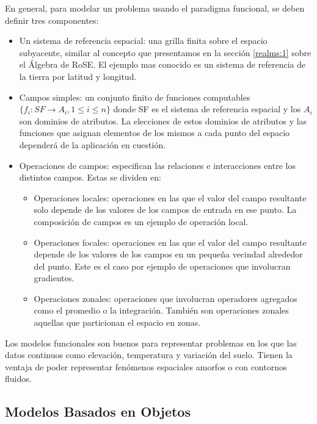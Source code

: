 En general, para modelar un problema usando el paradigma funcional, se deben definir tres componentes\textsuperscript{\cite{worboyz}}:
\begin{itemize}
    \item Un sistema de referencia espacial: una grilla finita sobre el espacio subyacente,
    similar al concepto que presentamos en la sección \ref{realms:1} sobre el Álgebra de RoSE.
    El ejemplo mas conocido es un sistema de referencia de la tierra por latitud y longitud.
    \item Campos simples: un conjunto finito de funciones computables $\{f_i: SF \rightarrow A_i, 1 \le i \le n\}$
    donde SF es el sistema de referencia espacial y los $A_i$ son dominios de atributos. La elecciones de estos dominios de atributos
    y las funciones que asignan elementos de los mismos a cada punto del espacio dependerá de la aplicación en cuestión.
    \item Operaciones de campos: especifican las relaciones e interacciones entre los distintos campos. Estas se dividen en:
    \begin{itemize}
        \item Operaciones locales: operaciones en las que el valor del campo resultante solo depende de los valores de los campos de entrada en ese punto.
        La composición de campos es un ejemplo de operación local.
        \item Operaciones focales: operaciones en las que el valor del campo resultante depende de los valores de los campos en un pequeña vecindad alrededor del punto.
        Este es el caso por ejemplo de operaciones que involucran gradientes.
        \item Operaciones zonales: operaciones que involucran operadores agregados como el promedio o la integración. También son operaciones
        zonales aquellas que particionan el espacio en zonas.
    \end{itemize}
\end{itemize}

Los modelos funcionales son buenos para representar problemas en los que las datos continuos
como elevación, temperatura y variación del suelo.
Tienen la ventaja de poder representar fenómenos espaciales amorfos o con contornos fluidos.

\subsection{Modelos Basados en Objetos} \label{sec:s:obj}

